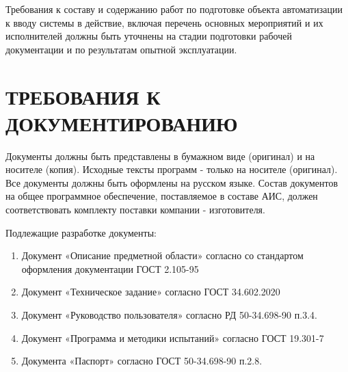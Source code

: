 \documentclass[russian, utf8, 12pt,pointsubsection,floatsubsection]{eskdtext}
\begin{document}
Требования к составу и содержанию работ по подготовке объекта автоматизации к вводу системы в действие, включая перечень основных мероприятий и их исполнителей должны быть уточнены на стадии подготовки рабочей документации и по результатам опытной эксплуатации.


\section{ТРЕБОВАНИЯ К ДОКУМЕНТИРОВАНИЮ}
Документы должны быть представлены в бумажном виде (оригинал) и на носителе (копия). Исходные тексты программ - только на носителе (оригинал).
Все документы должны быть оформлены на русском языке. Состав документов на общее программное обеспечение, поставляемое в составе АИС, должен соответствовать комплекту поставки компании - изготовителя.

Подлежащие разработке документы:
\begin{enumerate}
    \item Документ	«Описание	предметной	области»	согласно	со	стандартом оформления документации ГОСТ 2.105-95
\item Документ «Техническое задание» согласно ГОСТ 34.602.2020
\item Документ «Руководство пользователя» согласно РД 50-34.698-90 п.3.4.
\item Документ «Программа и методики испытаний» согласно ГОСТ 19.301-7
\item Документа «Паспорт» согласно ГОСТ 50-34.698-90 п.2.8.
\end{enumerate}
\end{document}
